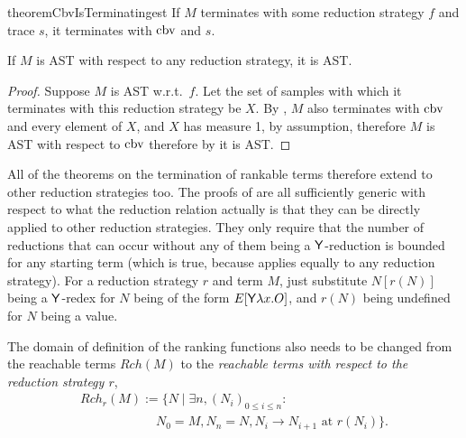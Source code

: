 \begin{restatable}{theorem}{CbvIsTerminatingest} \label{thm:CbvIsTerminatingest}
If $M$ terminates with some reduction strategy $f$ and trace $s$, it terminates with $\operatorname{cbv}$ and $s$.
\end{restatable}

\begin{corollary}
\label{cor:Reduction strategy independence}
If $M$ is AST with respect to any reduction strategy, it is AST.
\end{corollary}
\begin{proof}
Suppose $M$ is AST w.r.t.~$f$. Let the set of samples with which it terminates with this reduction strategy be $X$. By , $M$ also terminates with $\operatorname{cbv}$ and every element of $X$, and $X$ has measure 1, by assumption, therefore $M$ is AST with respect to $\operatorname{cbv}$ therefore by  it is AST.
\end{proof}

All of the theorems on the termination of rankable terms therefore extend to other reduction strategies too. The proofs of  are all sufficiently generic with respect to what the reduction relation actually is that they can be directly applied to other reduction strategies. They only require that the number of reductions that can occur without any of them being a $\mathsf{Y}$-reduction is bounded for any starting term (which is true, because  applies equally to any reduction strategy). For a reduction strategy $r$ and term $M$, just substitute $N[r(N)]$ being a $\mathsf{Y}$-redex for $N$ being of the form $E[\mathsf{Y} \lambda x. O]$, and $r(N)$ being undefined for $N$ being a value.

The domain of definition of the ranking functions also needs to be changed from the reachable terms $\mathit{Rch}(M)$ to the \emph{reachable terms with respect to the reduction strategy $r$},
\[
\begin{array}{l}
\mathit{Rch}_r(M) := \{N \mid \exists n, (N_i)_{0 \leq i \leq n} : {}\\
\qquad\qquad\qquad N_0 = M, N_n = N, N_i \to N_{i+1} \text{ at } r(N_i)\}.
\end{array}
\]

